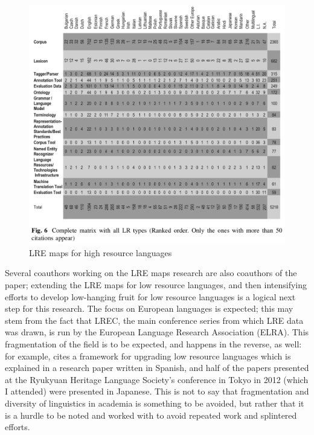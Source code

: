 \begin{figure}
 \centering
 \includegraphics[width=.8\textwidth]{img/lre.png}
 \caption{LRE maps for high resource languages \citep[460]{mariani2015language}}
 \label{fig:lre}
\end{figure}

Several coauthors working on the LRE maps research are also coauthors of the \citet{soria2017digital} paper; extending the LRE maps for low resource languages, and then intensifying efforts to develop low-hanging fruit for low resource languages is a logical next step for this research. The focus on European languages is expected; this may stem from the fact that LREC, the main conference series from which LRE data was drawn, is run by the European Language Research Association (ELRA). This fragmentation of the field is to be expected, and happens in the reverse, as well: for example, \citet{paricio2010new} cites a framework for upgrading low resource languages which is explained in a research paper written in Spanish, and half of the papers presented at the Ryukyuan Heritage Language Society's conference in Tokyo in 2012 (which I attended) were presented in Japanese. This is not to say that fragmentation and diversity of linguistics in academia is something to be avoided, but rather that it is a hurdle to be noted and worked with to avoid repeated work and splintered efforts.

%
%

